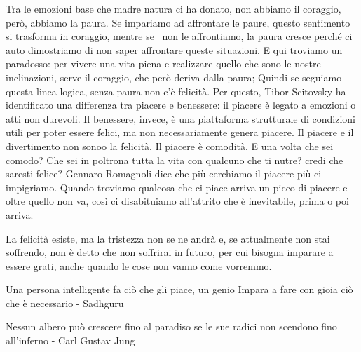 \documentclass[12pt]{book} %
\begin{document}
Tra le emozioni base che madre natura ci ha donato, non abbiamo il coraggio, però, abbiamo la paura. Se impariamo ad
affrontare le paure, questo sentimento si trasforma in coraggio, mentre se \ non le affrontiamo, la paura cresce perché
ci auto dimostriamo di non saper affrontare queste situazioni. E qui troviamo un paradosso: per vivere una vita piena e
realizzare quello che sono le nostre inclinazioni, serve il coraggio, che però deriva dalla paura; Quindi se seguiamo
questa linea logica, senza paura non c'è felicità. Per questo, Tibor Scitovsky ha identificato una differenza tra
piacere e benessere: il piacere è legato a emozioni o atti non durevoli. Il benessere, invece, è una piattaforma
strutturale di condizioni utili per poter essere felici, ma non necessariamente genera piacere. 
Il piacere e il divertimento non sonoo la felicità. Il piacere è comodità. E una volta che sei comodo? Che sei in poltrona tutta la vita con qualcuno che ti nutre? credi che saresti felice?
Gennaro Romagnoli dice che più cerchiamo il piacere più ci impigriamo. Quando troviamo qualcosa che ci piace arriva un picco di piacere e oltre quello non va, così ci disabituiamo all'attrito che è inevitabile, prima o poi arriva.


\bigskip

La felicità esiste, ma la tristezza non se ne andrà e, se attualmente non stai soffrendo, non è detto che non soffrirai in futuro, per cui bisogna imparare a essere grati, anche quando le cose non vanno come vorremmo. 


\bigskip

Una persona intelligente fa ciò che gli piace, un genio Impara a fare con gioia ciò che è necessario - Sadhguru


\bigskip

Nessun albero può crescere fino al paradiso se le sue radici non scendono fino all'inferno - Carl Gustav Jung
\end{document}
